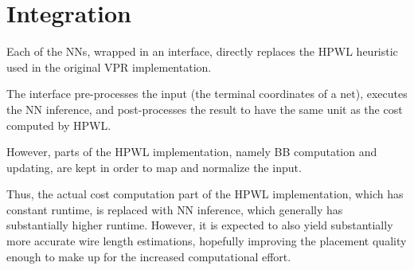 \section{Integration}

Each of the \glspl{NN}, wrapped in an interface, directly replaces the \gls{HPWL} heuristic used in the original \gls{VPR} implementation.

The interface pre-processes the input (the terminal coordinates of a net), executes the \gls{NN} inference, and post-processes the result to have the same unit as the cost computed by \gls{HPWL}.

However, parts of the \gls{HPWL} implementation, namely \gls{BB} computation and updating, are kept in order to map and normalize the input.

Thus, the actual cost computation part of the \gls{HPWL} implementation, which has constant runtime, is replaced with \gls{NN} inference, which generally has substantially higher runtime. However, it is expected to also yield substantially more accurate wire length estimations, hopefully improving the placement quality enough to make up for the increased computational effort.


